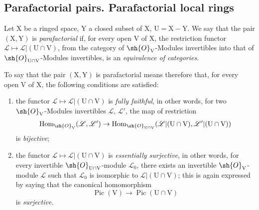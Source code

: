 \subsection{Parafactorial pairs. Parafactorial local rings}
\label{subsection:IV.21.13}
\label{IV.21.13}

\begin{definition}[21.13.1]
\label{IV.21.13.1}
Let $\mathrm{X}$ be a ringed space, $\mathrm{Y}$ a closed subset of $\mathrm{X}$, $\mathrm{U}=\mathrm{X}-\mathrm{Y}$.
We say that the pair $(\mathrm{X},\mathrm{Y})$ is \emph{parafactorial} if, for every open $\mathrm{V}$ of $\mathrm{X}$, the restriction functor $\mathscr{L}\mapsto\mathscr{L}|(\mathrm{U}\cap\mathrm{V})$, from the category of $\sh{O}_{\mathrm{V}}$-Modules invertibles into that of $\sh{O}_{\mathrm{U}\cap\mathrm{V}}$-Modules invertibles, is an \emph{equivalence of categories}.
\end{definition}

To say that the pair $(\mathrm{X},\mathrm{Y})$ is parafactorial means therefore that, for every open $\mathrm{V}$ of $\mathrm{X}$, the following conditions are satisfied:
\begin{enumerate}[label=\arabic*\textsuperscript{o}]
  \item the functor $\mathscr{L}\mapsto\mathscr{L}|(\mathrm{U}\cap\mathrm{V})$ is \emph{fully faithful}, in other words, for two $\sh{O}_{\mathrm{V}}$-Modules invertibles $\mathscr{L}$, $\mathscr{L}'$, the map of restriction
  \[
    \operatorname{Hom}_{\sh{O}_{\mathrm{V}}}(\mathscr{L},\mathscr{L}')\to\operatorname{Hom}_{\sh{O}_{\mathrm{U}\cap\mathrm{V}}}(\mathscr{L}|(\mathrm{U}\cap\mathrm{V}),\mathscr{L}'|(\mathrm{U}\cap\mathrm{V}))
  \]
  is \emph{bijective};
  \item the functor $\mathscr{L}\mapsto\mathscr{L}|(\mathrm{U}\cap\mathrm{V})$ is \emph{essentially surjective}, in other words, for every invertible $\sh{O}_{\mathrm{U}\cap\mathrm{V}}$-module $\mathscr{L}_0$, there exists an invertible $\sh{O}_{\mathrm{V}}$-module $\mathscr{L}$ such that $\mathscr{L}_0$ is
isomorphic to $\mathscr{L}|(\mathrm{U}\cap\mathrm{V})$; this is again expressed by saying that the canonical homomorphism 
  \[
    \operatorname{Pic}(\mathrm{V})\to\operatorname{Pic}(\mathrm{U}\cap\mathrm{V})
  \]
  is \emph{surjective}.
\end{enumerate}

